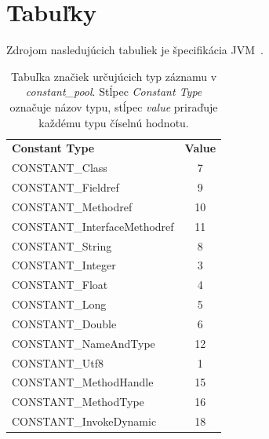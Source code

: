 \documentclass[11pt,final,oneside]{fithesis}
\begin{document}
\nocite{RedHat:Javassist}
\clearpage
{} 
 
 

\appendix

\chapter{Tabuľky}
Zdrojom nasledujúcich tabuliek je špecifikácia
JVM~\cite{Lindholm:2013:JVM:2462629}.

\begin{table}
  \begin{tabular}{| l | c |}
    \hline
    \textbf{Constant Type} & \textbf{Value} \\
    \hhline{|=|=|}
    CONSTANT\_Class & 7 \\ \hline
    CONSTANT\_Fieldref & 9 \\ \hline
    CONSTANT\_Methodref & 10 \\ \hline
    CONSTANT\_InterfaceMethodref & 11 \\ \hline
    CONSTANT\_String & 8 \\ \hline
    CONSTANT\_Integer & 3 \\ \hline
    CONSTANT\_Float & 4 \\ \hline
    CONSTANT\_Long & 5 \\ \hline
    CONSTANT\_Double & 6 \\ \hline
    CONSTANT\_NameAndType & 12 \\ \hline
    CONSTANT\_Utf8 & 1 \\ \hline
    CONSTANT\_MethodHandle & 15 \\ \hline
    CONSTANT\_MethodType & 16 \\ \hline
    CONSTANT\_InvokeDynamic & 18 \\
    \hline
  \end{tabular}
  \caption{Tabuľka značiek určujúcich typ záznamu v \textit{constant\_pool}.
  Stĺpec \textit{Constant Type} označuje názov typu, stĺpec \textit{value}
  priraďuje každému typu číselnú hodnotu.}
  \label{tab:tab1}
\end{table}
\end{document}
